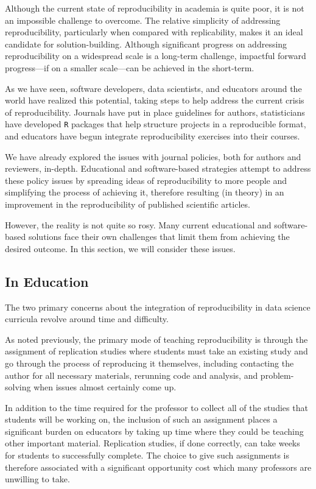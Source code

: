 \documentclass[12pt,twoside]{reedthesis}
\begin{document}
Although the current state of reproducibility in academia is quite poor, it is not an impossible challenge to overcome. The relative simplicity of addressing reproducibility, particularly when compared with replicability, makes it an ideal candidate for solution-building. Although significant progress on addressing reproducibility on a widespread scale is a long-term challenge, impactful forward progress---if on a smaller scale---can be achieved in the short-term.

As we have seen, software developers, data scientists, and educators around the world have realized this potential, taking steps to help address the current crisis of reproducibility. Journals have put in place guidelines for authors, statisticians have developed \texttt{R} packages that help structure projects in a reproducible format, and educators have begun integrate reproducibility exercises into their courses.

We have already explored the issues with journal policies, both for authors and reviewers, in-depth. Educational and software-based strategies attempt to address these policy issues by spreading ideas of reproducibility to more people and simplifying the process of achieving it, therefore resulting (in theory) in an improvement in the reproducibility of published scientific articles.

However, the reality is not quite so rosy. Many current educational and software-based solutions face their own challenges that limit them from achieving the desired outcome. In this section, we will consider these issues.

\hypertarget{in-education}{%
\subsection{In Education}\label{in-education}}

The two primary concerns about the integration of reproducibility in data science curricula revolve around time and difficulty.

As noted previously, the primary mode of teaching reproducibility is through the assignment of replication studies where students must take an existing study and go through the process of reproducing it themselves, including contacting the author for all necessary materials, rerunning code and analysis, and problem-solving when issues almost certainly come up.

In addition to the time required for the professor to collect all of the studies that students will be working on, the inclusion of such an assignment places a significant burden on educators by taking up time where they could be teaching other important material. Replication studies, if done correctly, can take weeks for students to successfully complete. The choice to give such assignments is therefore associated with a significant opportunity cost which many professors are unwilling to take.
\end{document}

